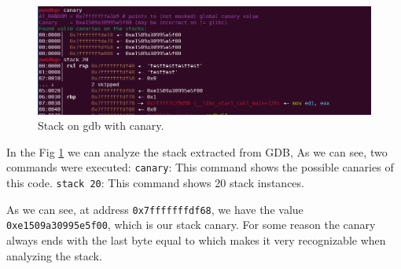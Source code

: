     \begin{figure}[htbp]
        \centering
        \includegraphics[width=1\linewidth]{Images/photo_of_the_stack_with_canary.png}
        \caption{Stack on gdb with canary.}
        \label{fig:canaryongdb}
    \end{figure}
    In the Fig \ref{fig:canaryongdb} we can analyze the stack extracted from GDB, As we can see, two commands were executed:\newline
    \texttt{canary}: This command shows the possible canaries of this code.\newline
    \texttt{stack 20}: This command shows 20 stack instances.
    
    As we can see, at address \texttt{0x7fffffffdf68}, we have the value \texttt{0xe1509a30995e5f00}, which is our stack canary.\newline
    For some reason the canary always ends with the last byte equal to  which makes it very recognizable when analyzing the stack.\newline
    \clearpage
